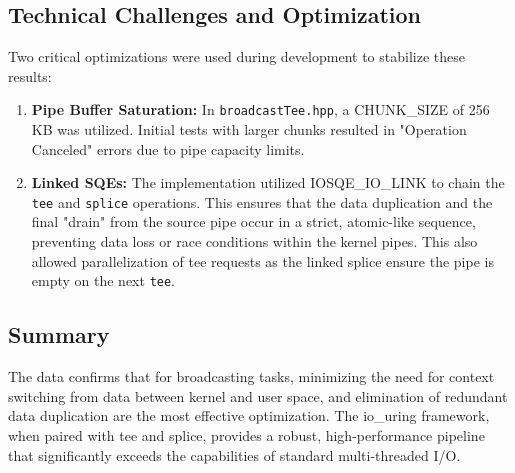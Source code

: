 \documentclass[
	a4paper,
	10pt,
	unnumberedsections,
	twoside, 
]{LTJournalArticle}
\begin{document}
\subsection{Technical Challenges and Optimization}
Two critical optimizations were used during development to stabilize these results:
\begin{enumerate}
\item \textbf{Pipe Buffer Saturation:} In \texttt{broadcastTee.hpp}, a CHUNK\_SIZE of 256 KB was utilized. Initial tests with larger chunks resulted in "Operation Canceled" errors due to pipe capacity limits.

\item \textbf{Linked SQEs:} The implementation utilized IOSQE\_IO\_LINK to chain the \texttt{tee} and \texttt{splice} operations. This ensures that the data duplication and the final "drain" from the source pipe occur in a strict, atomic-like sequence, preventing data loss or race conditions within the kernel pipes. This also allowed parallelization of tee requests as the linked splice ensure the pipe is empty on the next \texttt{tee}.
\end{enumerate}

\subsection{Summary}
The data confirms that for broadcasting tasks, minimizing the need for context switching from data between kernel and user space, and elimination of redundant data duplication are the most effective optimization. The io\_uring framework, when paired with tee and splice, provides a robust, high-performance pipeline that significantly exceeds the capabilities of standard multi-threaded I/O.

\end{document}
